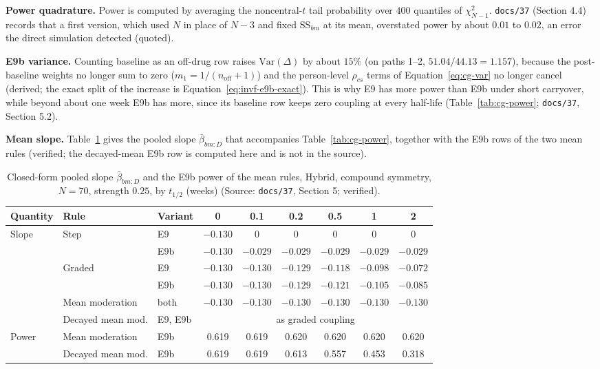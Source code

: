 \documentclass[11pt]{article}
\newcommand{\code}[1]{\texttt{#1}}
\begin{document}
\textbf{Power quadrature.} Power is computed by averaging the
noncentral-$t$ tail probability over $400$ quantiles of
$\chi^2_{N-1}$. \code{docs/37} (Section 4.4) records that a first
version, which used $N$ in place of $N-3$ and fixed $\mathrm{SS}_{bm}$
at its mean, overstated power by about $0.01$ to $0.02$, an error the
direct simulation detected (quoted).

\textbf{E9b variance.} Counting baseline as an off-drug row raises
$\mathrm{Var}(\Delta)$ by about $15\%$ (on paths 1--2,
$51.04/44.13 = 1.157$), because the post-baseline weights no longer sum to zero
($m_1 = 1/(n_{\mathrm{off}}+1)$) and the person-level $\rho_{cs}$ terms of
Equation~\eqref{eq:cg-var} no longer cancel (derived; the exact split
of the increase is Equation~\eqref{eq:invf-e9b-exact}). This is why E9
has more power than E9b under short carryover, while beyond about one
week E9b has more, since its baseline row keeps zero coupling at every
half-life (Table~\ref{tab:cg-power}; \code{docs/37}, Section 5.2).

\textbf{Mean slope.} Table~\ref{tab:inve-slope} gives the pooled slope
$\bar\beta_{bm:D}$ that accompanies Table~\ref{tab:cg-power}, together
with the E9b rows of the two mean rules (verified; the decayed-mean E9b
row is computed here and is not in the source).

\begin{table}[h]
\centering\small
\caption{Closed-form pooled slope $\bar\beta_{bm:D}$ and the E9b power
of the mean rules, Hybrid, compound symmetry, $N = 70$, strength $0.25$,
by $t_{1/2}$ (weeks) (Source: \code{docs/37}, Section 5; verified).}
\label{tab:inve-slope}
\begin{tabular}{@{}lllcccccc@{}}
\toprule
Quantity & Rule & Variant & 0 & 0.1 & 0.2 & 0.5 & 1 & 2 \\
\midrule
Slope & Step & E9  & $-0.130$ & 0 & 0 & 0 & 0 & 0 \\
      &      & E9b & $-0.130$ & $-0.029$ & $-0.029$ & $-0.029$ & $-0.029$ & $-0.029$ \\
      & Graded & E9  & $-0.130$ & $-0.130$ & $-0.129$ & $-0.118$ & $-0.098$ & $-0.072$ \\
      &        & E9b & $-0.130$ & $-0.130$ & $-0.129$ & $-0.121$ & $-0.105$ & $-0.085$ \\
      & Mean moderation & both & $-0.130$ & $-0.130$ & $-0.130$ & $-0.130$ & $-0.130$ & $-0.130$ \\
      & Decayed mean mod. & E9, E9b & \multicolumn{6}{c}{as graded coupling} \\
\midrule
Power & Mean moderation & E9b & 0.619 & 0.619 & 0.620 & 0.620 & 0.620 & 0.620 \\
      & Decayed mean mod. & E9b & 0.619 & 0.619 & 0.613 & 0.557 & 0.453 & 0.318 \\
\bottomrule
\end{tabular}
\end{table}
\end{document}
